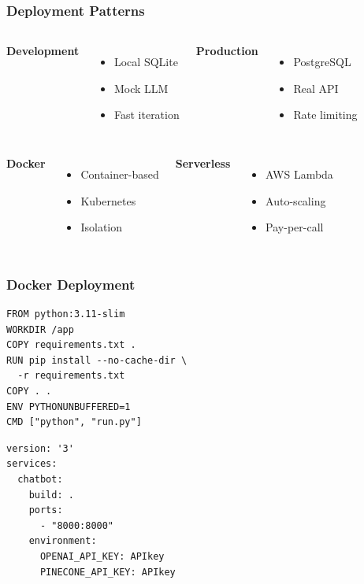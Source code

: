 \documentclass[aspectratio=169,11pt]{beamer}
\begin{document}
\begin{frame}
  \frametitle{Deployment Patterns}

  \begin{columns}[T]
    \textbf{Development}
    \begin{itemize}
      \item Local SQLite
      \item Mock LLM
      \item Fast iteration
    \end{itemize}

    \textbf{Production}
    \begin{itemize}
      \item PostgreSQL
      \item Real API
      \item Rate limiting
    \end{itemize}
  \end{columns}

  \begin{columns}[T]
    \textbf{Docker}
    \begin{itemize}
      \item Container-based
      \item Kubernetes
      \item Isolation
    \end{itemize}

    \textbf{Serverless}
    \begin{itemize}
      \item AWS Lambda
      \item Auto-scaling
      \item Pay-per-call
    \end{itemize}
  \end{columns}
\end{frame}

\begin{frame}[fragile]
  \frametitle{Docker Deployment}

  \begin{lstlisting}
FROM python:3.11-slim
WORKDIR /app
COPY requirements.txt .
RUN pip install --no-cache-dir \
  -r requirements.txt
COPY . .
ENV PYTHONUNBUFFERED=1
CMD ["python", "run.py"]
  \end{lstlisting}

  \begin{lstlisting}
version: '3'
services:
  chatbot:
    build: .
    ports:
      - "8000:8000"
    environment:
      OPENAI_API_KEY: APIkey
      PINECONE_API_KEY: APIkey
  \end{lstlisting}
\end{frame}
\end{document}

